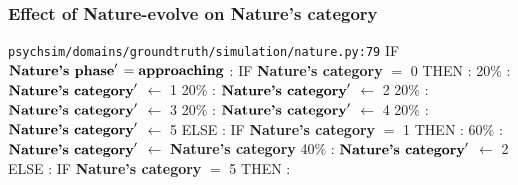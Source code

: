 \documentclass{article}%
\begin{document}
\subsubsection{Effect of Nature{-}evolve on Nature's category}%
\label{ssubsec:Effect of Nature{-}evolve on Nature's category}%
\begin{flushleft}%
\verb|psychsim/domains/groundtruth/simulation/nature.py:79|%
\linebreak%
IF %
$\mbox{\textbf{Nature's phase}} '$%
\linebreak%
\hspace*{2em}%
$= \mbox{\textbf{approaching}}$%
: %
IF %
\textbf{Nature's category}%
$=$%
0%
\linebreak%
\hspace*{4em}%
THEN %
: %
\linebreak%
\hspace*{6em}%
20\%%
: %
$\mbox{\textbf{Nature's category}} '$%
$\leftarrow$%
1%
\linebreak%
\hspace*{6em}%
20\%%
: %
$\mbox{\textbf{Nature's category}} '$%
$\leftarrow$%
2%
\linebreak%
\hspace*{6em}%
20\%%
: %
$\mbox{\textbf{Nature's category}} '$%
$\leftarrow$%
3%
\linebreak%
\hspace*{6em}%
20\%%
: %
$\mbox{\textbf{Nature's category}} '$%
$\leftarrow$%
4%
\linebreak%
\hspace*{6em}%
20\%%
: %
$\mbox{\textbf{Nature's category}} '$%
$\leftarrow$%
5%
\linebreak%
\hspace*{4em}%
ELSE %
: %
IF %
\textbf{Nature's category}%
$=$%
1%
\linebreak%
\hspace*{6em}%
THEN %
: %
\linebreak%
\hspace*{8em}%
60\%%
: %
$\mbox{\textbf{Nature's category}} '$%
$\leftarrow$%
\textbf{Nature's category}%
\linebreak%
\hspace*{8em}%
40\%%
: %
$\mbox{\textbf{Nature's category}} '$%
$\leftarrow$%
2%
\linebreak%
\hspace*{6em}%
ELSE %
: %
IF %
\textbf{Nature's category}%
$=$%
5%
\linebreak%
\hspace*{8em}%
THEN %
: %
\linebreak%

\end{flushleft}
\end{document}
